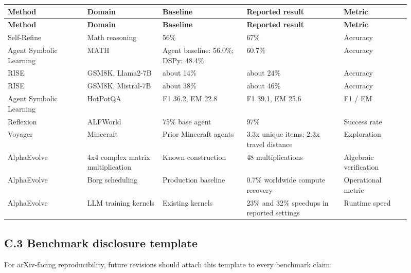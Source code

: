 {\TableTight
\begin{longtable}{@{}L{0.18\linewidth}L{0.17\linewidth}L{0.19\linewidth}L{0.22\linewidth}L{0.15\linewidth}@{}}
\toprule
\textbf{Method} & \textbf{Domain} & \textbf{Baseline} & \textbf{Reported result} & \textbf{Metric} \\
\midrule
\endfirsthead
\toprule
\textbf{Method} & \textbf{Domain} & \textbf{Baseline} & \textbf{Reported result} & \textbf{Metric} \\
\midrule
\endhead
\bottomrule
\endlastfoot
Self-Refine & Math reasoning & 56\% & 67\% & Accuracy \\
Agent Symbolic Learning & MATH & Agent baseline: 56.0\%; DSPy: 48.4\% & 60.7\% & Accuracy \\
RISE & GSM8K, Llama2-7B & about 14\% & about 24\% & Accuracy \\
RISE & GSM8K, Mistral-7B & about 38\% & about 46\% & Accuracy \\
Agent Symbolic Learning & HotPotQA & F1 36.2, EM 22.8 & F1 39.1, EM 25.6 & F1 / EM \\
Reflexion & ALFWorld & 75\% base agent & 97\% & Success rate \\
Voyager & Minecraft & Prior Minecraft agents & 3.3x unique items; 2.3x travel distance & Exploration \\
AlphaEvolve & 4x4 complex matrix multiplication & Known construction & 48 multiplications & Algebraic verification \\
AlphaEvolve & Borg scheduling & Production baseline & 0.7\% worldwide compute recovery & Operational metric \\
AlphaEvolve & LLM training kernels & Existing kernels & 23\% and 32\% speedups in reported settings & Runtime speed \\
\end{longtable}}

\subsection*{C.3 Benchmark disclosure template}

For arXiv-facing reproducibility, future revisions should attach this template to every benchmark claim:

